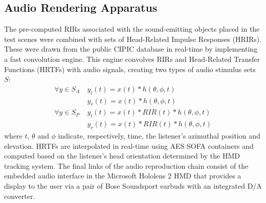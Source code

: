 \subsection{Audio Rendering Apparatus}
\label{sec:audio-apparatus}
The pre-computed RIRs associated with the sound-emitting objects placed in the test scenes were combined with sets of Head-Related Impulse Responses (HRIRs). These were drawn from the public CIPIC database in real-time by implementing a fast convolution engine. This engine convolves RIRs and Head-Related Transfer Functions (HRTFs) with audio signals, creating two types of audio stimulus sets $S$: 
\begin{align}
     \forall y \in S_{A}\ & y_l(t) = x(t) * h(\theta, \phi, t)\\
     & y_r(t) = x(t) * h(\theta, \phi, t) \\
     \forall y \in S_{P}\ & y_l(t) = x(t) * RIR(t) * h(\theta, \phi, t) \\
     & y_r(t) = x(t) * RIR(t) * h(\theta, \phi, t)
\end{align}
where $t$, $\theta$ and $\phi$ indicate, respectively, time, the listener's azimuthal position and elevation. HRTFs are interpolated in real-time using AES SOFA containers \cite{hoene2017mysofa} and computed based on the listener's head orientation determined by the HMD tracking system. The final links of the audio reproduction chain consist of the embedded audio interface in the Microsoft Hololens 2 HMD that provides a display to the user via a pair of Bose Soundsport earbuds with an integrated D/A converter. \par

